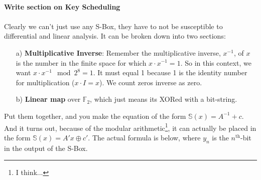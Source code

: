     \\
    \textbf{Write section on Key Scheduling}\\
    \\
    Clearly we can't just use any S-Box, they have to not be susceptible to differential and linear analysis. It can be broken down into two sections:
    \begin{enumerate}
        \item[a)] \textbf{Multiplicative Inverse}: Remember the multiplicative inverse, $x^{-1}$, of $x$ is the number in the finite space for which $x\cdot x^{-1}=1$. So in this context, we want $x\cdot x^{-1} \mod 2^8 = 1$. It must equal 1 because 1 is the identity number for multiplication ($x\cdot I=x$). We count zeros inverse as zero.
        \item[b)] \textbf{Linear map} over $\mathbb{F}_2$, which just means its XORed with a bit-string.
    \end{enumerate}
    Put them together, and you make the equation of the form $\mathbb{S}(x)=A^{-1}+c$. And it turns out, because of the modular arithmetic\footnote{I think...}, it can actually be placed in the form $\mathbb{S}(x) = A'x\oplus c'$. The actual formula is below, where $y_n$ is the $n^\textrm{th}$-bit in the output of the S-Box.\\
